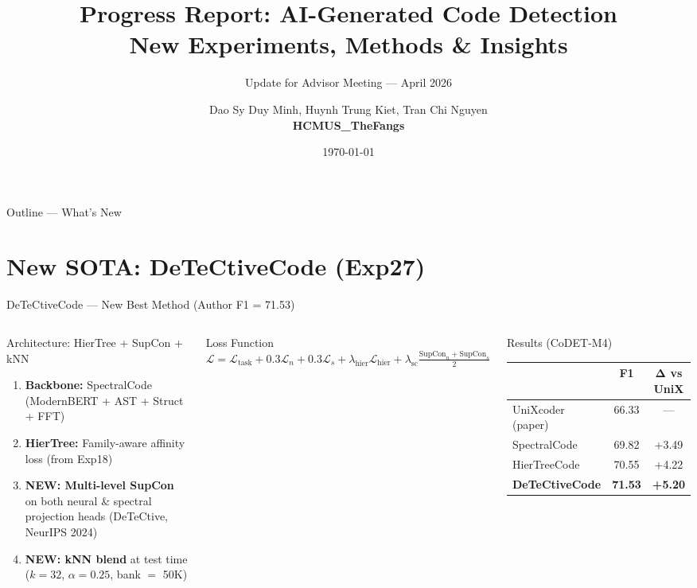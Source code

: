 \documentclass[aspectratio=169, 10pt]{beamer}
\title[AI Code Detection --- Progress Report]{%
  \textbf{Progress Report: AI-Generated Code Detection\\
  New Experiments, Methods \& Insights}}
\subtitle{Update for Advisor Meeting --- April 2026}
\author{%
  Dao Sy Duy Minh, Huynh Trung Kiet, Tran Chi Nguyen\\
  \textbf{HCMUS\_TheFangs}}
\institute{Ho Chi Minh City University of Science (HCMUS)\\VNUHCM}
\date{\today}
\begin{document}
\begin{frame}
\titlepage
\end{frame}

\begin{frame}{Outline --- What's New}
\tableofcontents
\end{frame}


\section{New SOTA: DeTeCtiveCode (Exp27)}

\begin{frame}{DeTeCtiveCode --- New Best Method (Author F1 = 71.53)}
\vspace{-0.2cm}
\begin{columns}[T]
\begin{block}{Architecture: HierTree + SupCon + kNN}
\small
\begin{enumerate}\setlength\itemsep{3pt}
    \item[\faCogs] \textbf{Backbone:} SpectralCode (ModernBERT + AST + Struct + FFT)
    \item[\faProjectDiagram] \textbf{HierTree:} Family-aware affinity loss (from Exp18)
    \item[\faStar] \textbf{NEW: Multi-level SupCon} on both neural \& spectral projection heads (DeTeCtive, NeurIPS 2024)
    \item[\faSearch] \textbf{NEW: kNN blend} at test time ($k\!=\!32$, $\alpha\!=\!0.25$, bank $=$ 50K)
\end{enumerate}
\end{block}

\begin{exampleblock}{\scriptsize Loss Function}
\scriptsize
$\mathcal{L} = \mathcal{L}_{\text{task}} + 0.3\mathcal{L}_n + 0.3\mathcal{L}_s + \lambda_{\text{hier}}\mathcal{L}_{\text{hier}} + \lambda_{\text{sc}}\frac{\text{SupCon}_n + \text{SupCon}_s}{2}$
\end{exampleblock}

\begin{alertblock}{Results (CoDET-M4)}
\centering\footnotesize
\begin{tabular}{lcc}
\toprule
& \textbf{F1} & $\boldsymbol{\Delta}$ vs UniX \\
\midrule
UniXcoder (paper) & 66.33 & --- \\
SpectralCode & 69.82 & +3.49 \\
HierTreeCode & 70.55 & +4.22 \\
\rowcolor{oursgreen}
\textbf{DeTeCtiveCode} & \textbf{71.53} & \textbf{+5.20} \\
\bottomrule
\end{tabular}
\end{alertblock}


\end{columns}
\end{frame}
\end{document}

